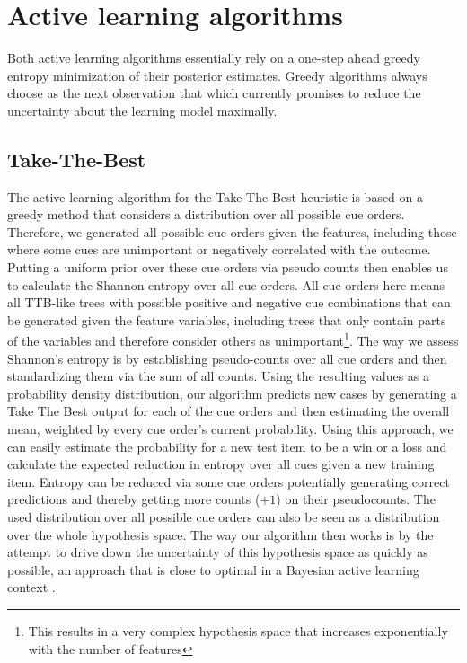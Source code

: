 \documentclass[10pt,letterpaper]{article}
\begin{document}
\section{Active learning algorithms}
Both active learning algorithms essentially rely on a one-step ahead greedy entropy minimization of their posterior estimates. Greedy algorithms always choose as the next observation that which currently promises to reduce the uncertainty about the learning model maximally. 


\subsection{Take-The-Best}
The active learning algorithm for the Take-The-Best heuristic is based on a greedy method that considers a distribution over all possible cue orders. Therefore, we generated all possible cue orders given the features, including those where some cues are unimportant or negatively correlated with the outcome. Putting a uniform prior over these cue orders via pseudo counts then enables us to calculate the Shannon entropy over all cue orders. All cue orders here means all TTB-like trees with possible positive and negative cue combinations that can be generated given the feature variables, including trees that only contain parts of the variables and therefore consider others as unimportant\footnote{This results in a very complex hypothesis space that increases exponentially with the number of features}. The way we assess Shannon's entropy is by establishing pseudo-counts over all cue orders and then standardizing them via the sum of all counts. Using the resulting values as a probability density distribution, our algorithm predicts new cases by generating a Take The Best output for each of the cue orders and then estimating the overall mean, weighted by every cue order's current probability. Using this approach, we can easily estimate the probability for a new test item to be a win or a loss and calculate the expected reduction in entropy over all cues given a new training item. Entropy can be reduced via some cue orders potentially generating correct predictions and thereby getting more counts ($+1$) on their pseudocounts. The used distribution over all possible cue orders can also be seen as a distribution over the whole hypothesis space. The way our algorithm then works is by the attempt to drive down the uncertainty of this hypothesis space as quickly as possible, an approach that is close to optimal in a Bayesian active learning context \citep{golovin2010near}. 
\end{document}
